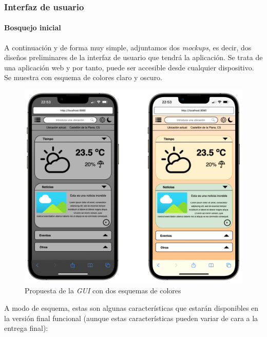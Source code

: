 \documentclass[../ei103948-project-documentation.tex]{subfiles}
\begin{document}
                                \newpage
                                \subsubsection{Interfaz de usuario}
                                    \paragraph{Bosquejo inicial}
                                A continuación y de forma muy simple, adjuntamos dos \textit{mockups}, es decir, dos diseños preliminares de la interfaz de usuario que tendrá la aplicación. Se trata de una aplicación web y por tanto, puede ser accesible desde cualquier dispositivo. Se muestra con esquema de colores claro y oscuro.
                                \begin{figure}[H]
                                    \begin{center}
                                    \includegraphics[scale=0.18]{images/GuiTelefono.png}
                                    \end{center}
                                    \caption{Propuesta de la \textit{GUI} con dos esquemas de colores}
                                \end{figure}
                                A modo de esquema, estas son algunas características que estarán disponibles en la versión final funcional (aunque estas características pueden variar de cara a la entrega final):
                        
\end{document}
